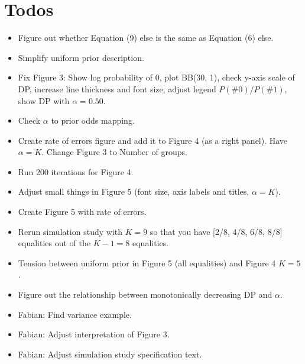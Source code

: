 \documentclass[11pt,a4paper]{article}
\theoremstyle{definition} %
\theoremstyle{case}
\begin{document}
\section*{Todos}
\begin{itemize}
    \item Figure out whether Equation (9) else is the same as Equation (6) else.
    \item Simplify uniform prior description.
    \item Fix Figure 3: Show log probability of 0, plot BB(30, 1), check y-axis scale of DP, increase line thickness and font size, adjust legend $P(\#0) / P(\#1)$, show DP with $\alpha = 0.50$.
    \item Check $\alpha$ to prior odds mapping.
    \item Create rate of errors figure and add it to Figure 4 (as a right panel). Have $\alpha = K$. Change Figure 3 to Number of groups.
    \item Run 200 iterations for Figure 4.
    \item Adjust small things in Figure 5 (font size, axis labels and titles, $\alpha = K$).
    \item Create Figure 5 with rate of errors.
    \item Rerun simulation study with $K = 9$ so that you have [2/8, 4/8, 6/8, 8/8] equalities out of the $K - 1 = 8$ equalities.
    \item Tension between uniform prior in Figure 5 (all equalities) and Figure 4 $K = 5$.
    \item Figure out the relationship between monotonically decreasing DP and $\alpha$.
    \item Fabian: Find variance example.
    \item Fabian: Adjust interpretation of Figure 3. \checkmark
    \item Fabian: Adjust simulation study specification text. \checkmark
\end{itemize}

\tableofcontents


\iffalse
\end{document}
